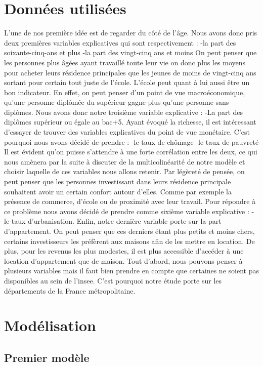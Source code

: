 \documentclass{article}
\begin{document}
\section{Données utilisées}
L’une de nos première idée est de regarder du côté de l’âge. Nous avons donc pris deux premières variables explicatives qui sont respectivement : 
-la part des soixante-cinq-ans et plus
-la part des vingt-cinq ans et moins
On peut penser que les personnes plus âgées ayant travaillé toute leur vie on donc plus les moyens pour acheter leurs résidence principales que les jeunes de moins de vingt-cinq ans sortant pour certain tout juste de l’école.
L’école peut quant à lui aussi être un bon indicateur. En effet, on peut penser d’un point de vue macroéconomique, qu’une personne diplômée du supérieur gagne plus qu’une personne sans diplômes. Nous avons donc notre troisième variable explicative : 
-La part des diplômes supérieur ou égale au bac+5.
Ayant évoqué la richesse, il est intéressant d’essayer de trouver des variables explicatives du point de vue monétaire. C’est pourquoi nous avons décidé de prendre : 
-le taux de chômage 
-le taux de pauvreté 
Il est évident qu’on puisse s’attendre à une forte corrélation entre les deux, ce qui nous amènera par la suite à discuter de la multicolinéarité de notre modèle et choisir laquelle de ces variables nous allons retenir.
Par légèreté de pensée, on peut penser que les personnes investissant dans leurs résidence principale souhaitent avoir un certain confort autour d'elles. Comme par exemple la présence de commerce, d’école ou de proximité avec leur travail. Pour répondre à ce problème nous avons décidé de prendre comme sixième variable explicative :
-le taux d’urbanisation.
Enfin, notre dernière variable porte sur la part d’appartement. On peut penser que ces derniers étant plus petits et moins chers, certains investisseurs les préfèrent aux maisons afin de les mettre en location. De plus, pour les revenus les plus modestes, il est plus accessible d’accéder à une location d’appartement que de maison.
Tout d'abord, nous pouvons penser à plusieurs variables mais il faut bien prendre en compte que 
certaines ne 
soient pas disponibles au sein de l’insee. C’est pourquoi notre étude porte sur les départements de la France métropolitaine.
\newpage
\section{Modélisation}
\subsection{Premier modèle}
\end{document}
